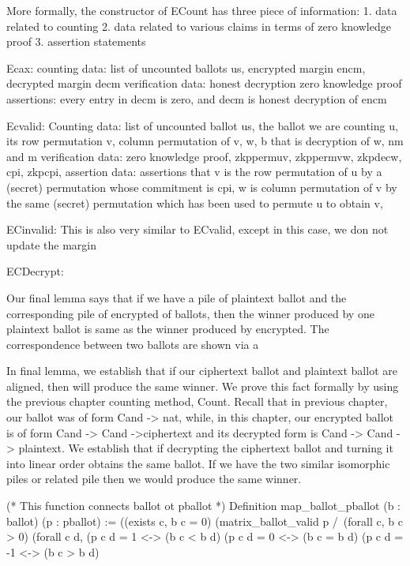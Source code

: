 More formally, the constructor of ECount has three piece of information:
1. data related to counting 
2. data related to various claims in terms of zero knowledge proof
3. assertion statements 

Ecax:
counting data: list of uncounted ballots us, encrypted margin encm, decrypted margin decm 
verification data: honest decryption zero knowledge proof
assertions: every entry in decm is zero, and decm is honest decryption of encm

Ecvalid: 
Counting data: list of uncounted ballot us, the ballot we are counting u, its row permutation v, column permutation of 
v, w, b that is decryption of w, nm and m
verification data: zero knowledge proof, zkppermuv, zkppermvw, zkpdecw, cpi, zkpcpi, 
assertion data: assertions that v is the row permutation of u by a (secret) permutation whose commitment is 
cpi, w is column permutation of v by the same (secret) permutation which has been used to permute u to obtain v, 

ECinvalid: 
This is also very similar to ECvalid, except in this case, we don not update the margin

ECDecrypt: 


Our final lemma says that if we have a pile of plaintext ballot and the corresponding pile of encrypted 
of ballots, then the winner produced by one plaintext ballot is same as the winner produced by 
encrypted. The correspondence between two ballots are shown via a 


In final lemma, we establish that if our ciphertext ballot and plaintext ballot are aligned, then will produce the 
same winner. We prove this fact formally by using the previous chapter counting method, Count. Recall that 
in previous chapter, our ballot was of form Cand -> nat, while, in this chapter, our encrypted ballot is 
of form Cand -> Cand ->ciphertext and its decrypted form is Cand -> Cand -> plaintext. We establish 
that if decrypting the ciphertext ballot and turning it into  linear order obtains the same ballot. If we have 
the two similar isomorphic piles or related pile then we would produce the same winner. 


(* This function connects ballot ot pballot *)
    Definition map_ballot_pballot (b : ballot) (p : pballot) :=
      ((exists c,  b c = 0)%
      (matrix_ballot_valid p /\ (forall c, b c > 0)%
       (forall c d, (p c d = 1 <-> (b c < b d)%
               (p c d = 0 <-> (b c = b d)%
               (p c d = -1 <-> (b c > b d)%
               

